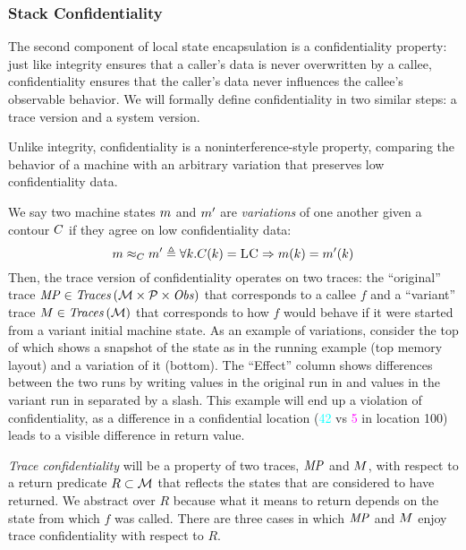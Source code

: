 \documentclass[acmsmall,review,anonymous]{acmart}\settopmatter{printfolios=true,printccs=false,printacmref=false}
\begin{document}
{\subsubsection{Stack Confidentiality}

The second component of local state encapsulation is a confidentiality
property: just like integrity ensures that a caller's data is never
overwritten by a callee, confidentiality ensures that the caller's data never
influences the callee's observable behavior. We will formally define
confidentiality in two similar steps: a trace version and a system
version.

Unlike integrity, confidentiality is a noninterference-style property,
comparing the behavior of a machine with an arbitrary variation that
preserves low confidentiality data.

We say two machine states \(m\) and \(m'\) are {\em variations}
of one another given a contour \(C\) if they agree on low
confidentiality data:
%
\[
m \approx_C m' \triangleq \forall k .
C(k) = \textsc{LC} \Rightarrow m(k) =
m'(k)
\]
%
Then, the trace version of confidentiality operates on two traces: the
``original'' trace $\mathit{MP} \in \mathit{Traces}\,({\mathcal M} \times \mathcal{P} \times \mathit{Obs})$ that corresponds to a callee $f$
and a ``variant'' trace $M \in \mathit{Traces}\,({\mathcal M})$ that corresponds to how $f$
would behave if it were started from a variant initial machine state.
%
As an example of variations, consider the top of 
which shows a snapshot of the state as in the running example (top
memory layout) and a variation of it (bottom).
%
The ``Effect'' column shows differences between the two runs by writing values
in the original run in {\high} and values in the variant run in {\varied}
separated by a slash.
%
This example will end up a violation of confidentiality, as a
difference in a confidential location (\textcolor{cyan}{42} vs
\textcolor{magenta}{5} in location 100) leads to a visible
difference in return value.


{\em Trace confidentiality} will be a property of two traces, \(\mathit{MP}\) and
\(M\), with respect to a return predicate \(R \subset {\mathcal M}\) that
reflects the states that are considered to have returned. We abstract over
\(R\) because what it means to return depends on the state from which
\(f\) was called. There are three cases in which \(\mathit{MP}\) and \(M\)
enjoy trace confidentiality with respect to \(R\).

}
\end{document}
